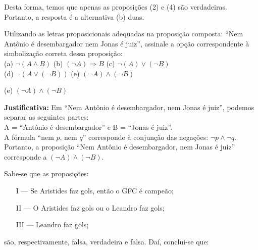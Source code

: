 \documentclass[12pt, a4paper, onecolumn]{exam}
\begin{document}
\begin{questions}
\begin{solution}
        Desta forma, temos que apenas as proposições (2) e (4) são verdadeiras. Portanto, a resposta é a alternativa (b) duas.

        
    \end{solution}
    
    \question[q6] Utilizando as letras proposicionais adequadas na proposição composta: “Nem Antônio é  desembargador nem Jonas é juiz”, assinale a opção correspondente à simbolização correta dessa proposição: \\[1em]
        (a) \( \neg ( A \wedge B ) \)           \hfill
        (b) \( ( \neg A ) \Rightarrow B \)      \hfill
        (c) \( \neg ( A ) \vee ( \neg B ) \)    \\[1em]
        (d) \( \neg ( A \vee ( \neg B ) ) \)    \hfill
        (e) \( ( \neg A ) \wedge ( \neg B ) \)
        
    \begin{solution}
        (e) \( ( \neg A ) \wedge ( \neg B ) \)
        
        \textbf{Justificativa:}
        Em  “Nem Antônio é desembargador, nem Jonas é juiz”, podemos separar as seguintes partes: \\[1em]
            A = “Antônio é desembargador” e 
            B = “Jonas é juiz”.\\[1em]
        A fórmula “nem \(p\), nem \(q\)” corresponde à conjunção das negações: \( \neg p \wedge \neg q \).   \\[1em]
        Portanto, a proposição “Nem Antônio é desembargador, nem Jonas é juiz” corresponde a \( ( \neg A ) \wedge ( \neg B ) \).
    \end{solution}
    
    \pagebreak
    
    \question[q7] Sabe-se que as proposições:
        \begin{enumerate}
            \item[I] — Se Aristides faz gols, então o GFC é campeão;
            \item[II] — O Aristides faz gols ou o Leandro faz gols;
            \item[III] — Leandro faz gols;
        \end{enumerate}
    são, respectivamente, falsa, verdadeira e falsa. Daí, conclui-se que:
    
\end{questions}
\end{document}
